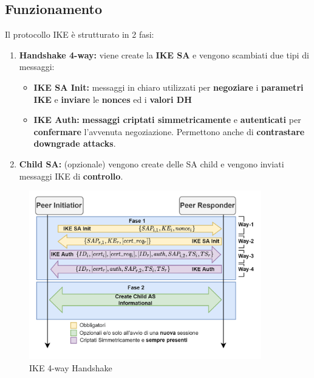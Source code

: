 \subsection{Funzionamento}
Il protocollo IKE è strutturato in 2 fasi:
\begin{proposition}
\begin{enumerate}
    \item \textbf{Handshake 4-way:} viene create la \textbf{IKE SA} e vengono scambiati due tipi di messaggi:
\begin{itemize}
    \item \textbf{IKE SA Init:} messaggi in chiaro utilizzati per \textbf{negoziare} i \textbf{parametri IKE}\footnotemark
     e \textbf{inviare} le \textbf{nonces} ed i \textbf{valori DH}\footnotemark
    \item \textbf{IKE Auth:} \textbf{messaggi criptati simmetricamente} e \textbf{autenticati} per \textbf{confermare} l'avvenuta negoziazione. Permettono anche di \textbf{contrastare downgrade attacks}.
\end{itemize}
\item \textbf{Child SA:} (opzionale) vengono create delle SA child e vengono inviati messaggi IKE di \textbf{controllo}.
\end{enumerate}
\end{proposition}
\begin{figure}[h]
    \centering
    \includegraphics[width=0.9\textwidth]{image/ikev2.png}
    \caption{IKE 4-way Handshake}
    \label{fig:ikev2}
\end{figure}

